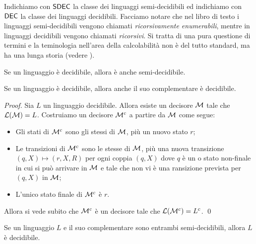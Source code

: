 \documentclass[runningheads,a4paper]{llncs}
\begin{document}
Indichiamo con $\mathsf{SDEC}$ la classe dei linguaggi semi-decidibili ed indichiamo con $\mathsf{DEC}$ la classe dei linguaggi decidibili. Facciamo notare che nel libro di testo \cite{HMU} i linguaggi semi-decidibili vengono chiamati \emph{ricorsivamente enumerabili}, mentre in linguaggi decidibili vengono chiamati \emph{ricorsivi}. Si tratta di una pura questione di termini e la teminologia nell'area della calcolabilit\`{a} non \`{e} del tutto standard, ma ha una lunga storia (vedere \cite{Soare96}).

\begin{remark}\label{rem:semi-dec-dec}
Se un linguaggio \`{e} decidibile, allora \`{e} anche semi-decidibile.
\end{remark}

\begin{theorem}\label{thm:compl-dec}
Se un linguaggio \`{e} decidibile, allora anche il suo complementare \`{e} decidibile.
\end{theorem}

\begin{proof}
Sia $L$ un linguaggio decidibile. Allora esiste un decisore $\mathcal{M}$ tale che $\mathcal{L}(\mathcal{M}) = L$. Costruiamo un decisore $\mathcal{M}^c$ a partire da $\mathcal{M}$ come segue:
\begin{itemize}
\item Gli stati di $\mathcal{M}^c$ sono gli stessi di $\mathcal{M}$, pi\`{u} un nuovo stato $r$;
\item Le transizioni di $\mathcal{M}^c$ sono le stesse di $\mathcal{M}$, pi\`{u} una nuova transizione $(q,X)\mapsto (r,X,R)$ per ogni coppia $(q,X)$ dove $q$ \`{e} un o stato non-finale in cui si pu\`{o} arrivare in $\mathcal{M}$ e tale che non vi \`{e} una ransizione prevista per $(q,X)$ in $\mathcal{M}$;
\item L'unico stato finale di $\mathcal{M}^c$ \`{e} $r$.
\end{itemize}
Allora si vede subito che $\mathcal{M}^c$ \`{e} un decisore tale che $\mathcal{L}(\mathcal{M}^c) = L^c$.
\qed\end{proof}

\begin{theorem}\label{thm:semi-compl-dec}
Se un linguaggio $L$ e il suo complementare sono entrambi semi-decidibili, allora $L$ \`{e} decidibile.
\end{theorem}
\end{document}
